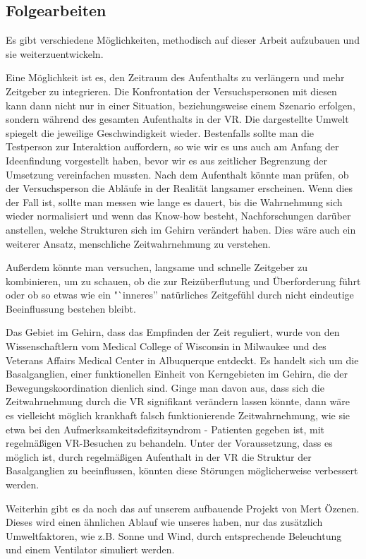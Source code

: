 \documentclass{Bericht}
\begin{document}
\subsection{Folgearbeiten}
Es gibt verschiedene Möglichkeiten, methodisch auf dieser Arbeit aufzubauen und sie weiterzuentwickeln.

Eine Möglichkeit ist es, den Zeitraum des Aufenthalts zu verlängern und mehr Zeitgeber zu integrieren. Die Konfrontation der Versuchspersonen mit diesen kann dann nicht nur in einer Situation, beziehungsweise einem Szenario erfolgen, sondern während des gesamten Aufenthalts in der VR. Die dargestellte Umwelt spiegelt die jeweilige Geschwindigkeit wieder. Bestenfalls sollte man die Testperson zur Interaktion auffordern, so wie wir es uns auch am Anfang der Ideenfindung vorgestellt haben, bevor wir es aus zeitlicher Begrenzung der Umsetzung vereinfachen mussten. Nach dem Aufenthalt könnte man prüfen, ob der Versuchsperson die Abläufe in der Realität langsamer erscheinen. Wenn dies der Fall ist, sollte man messen wie lange es dauert, bis die Wahrnehmung sich wieder normalisiert und wenn das Know-how besteht, Nachforschungen darüber anstellen, welche Strukturen sich im Gehirn verändert haben. Dies wäre auch ein weiterer Ansatz, menschliche Zeitwahrnehmung zu verstehen.

Außerdem könnte man versuchen, langsame und schnelle Zeitgeber zu  kombinieren, um zu schauen, ob die zur Reizüberflutung und Überforderung führt oder ob so etwas wie ein "`inneres'' natürliches Zeitgefühl durch nicht eindeutige Beeinflussung bestehen bleibt.

Das Gebiet im Gehirn, dass das Empfinden der Zeit reguliert, wurde von den Wissenschaftlern vom Medical College of Wisconsin in Milwaukee und des Veterans Affairs Medical Center in Albuquerque entdeckt. Es handelt sich um die Basalganglien, einer funktionellen Einheit von Kerngebieten im Gehirn, die der Bewegungskoordination dienlich sind. Ginge man davon aus, dass sich die Zeitwahrnehmung durch die VR signifikant verändern lassen könnte, dann wäre es vielleicht möglich krankhaft falsch funktionierende Zeitwahrnehmung, wie sie etwa bei den Aufmerksamkeitsdefizitsyndrom - Patienten gegeben ist, mit regelmäßigen VR-Besuchen zu behandeln. Unter der Voraussetzung, dass es  möglich ist, durch regelmäßigen Aufenthalt in der VR die Struktur der Basalganglien zu beeinflussen, könnten diese Störungen möglicherweise verbessert werden.

 
Weiterhin gibt es da noch das auf unserem aufbauende Projekt von Mert Özenen. Dieses wird einen ähnlichen Ablauf wie unseres haben, nur das zusätzlich Umweltfaktoren, wie z.B. Sonne und Wind, durch entsprechende Beleuchtung und einem Ventilator simuliert werden.
\end{document}
